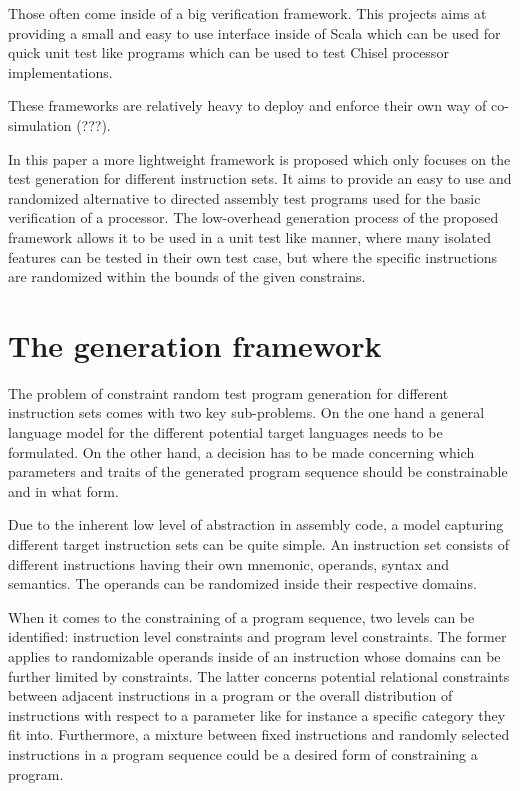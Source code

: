 \documentclass[conference]{IEEEtran}
\begin{document}

Those often come inside of a big verification framework. This projects aims at providing a 
small and easy to use interface inside of Scala which can be used for quick unit test like 
programs which can be used to test Chisel processor implementations.

These frameworks are relatively heavy to deploy and enforce their own way of co-simulation (???).


In this paper a more lightweight framework is proposed which only focuses on the test generation 
for different instruction sets. It aims to provide an easy to use and randomized alternative to 
directed assembly test programs used for the basic verification of a processor. The low-overhead 
generation process of the proposed framework allows it to be used in a unit test like manner, 
where many isolated features can be tested in their own test case, but where the specific 
instructions are randomized within the bounds of the given constrains.


\section{The generation framework}


The problem of constraint random test program generation for different instruction sets comes with 
two key sub-problems. On the one hand a general language model for the different potential target 
languages needs to be formulated. On the other hand, a decision has to be made concerning which 
parameters and traits of the generated program sequence should be constrainable and in what form.

Due to the inherent low level of abstraction in assembly code, a model capturing different target 
instruction sets can be quite simple. An instruction set consists of different instructions having 
their own mnemonic, operands, syntax and semantics. The operands can be randomized inside their 
respective domains.

When it comes to the constraining of a program sequence, two levels can be identified: instruction 
level constraints and program level constraints. The former applies to randomizable operands inside 
of an instruction whose domains can be further limited by constraints. The latter concerns potential 
relational constraints between adjacent instructions in a program or the overall distribution of 
instructions with respect to a parameter like for instance a specific category they fit into. 
Furthermore, a mixture between fixed instructions and randomly selected instructions in a program 
sequence could be a desired form of constraining a program.
\end{document}
